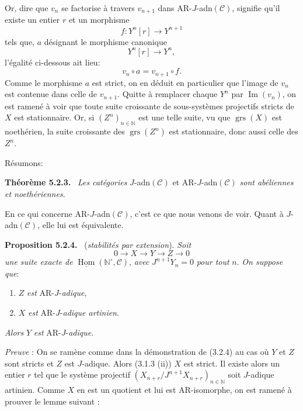 \documentclass[11pt]{article}
\newenvironment{statement}[1]{\par\medskip\noindent\textbf{#1.}\ }{\par\medskip}
\DeclareMathOperator{\Hom}{Hom}
\providecommand{\uHom}{\underline{\Hom}}
\providecommand{\Hom}{\operatorname{Hom}}
\providecommand{\Im}{\operatorname{Im}}
\renewcommand{\Im}{\operatorname{Im}}
\providecommand{\grs}{\operatorname{grs}}
\providecommand{\Im}{\operatorname{Im}}
\providecommand{\Hom}{\operatorname{Hom}}
\begin{document}
Or, dire que \(v_n\) se factorise à travers \(v_{n+1}\) dans AR-\(J\)-adn\((\mathcal C)\), signifie qu'il existe un entier \(r\) et un morphisme
\[
f:Y^n[r]\longrightarrow Y^{n+1}
\]
tels que, \(a\) désignant le morphisme canonique
\[
Y^n[r]\longrightarrow Y^n,
\]
l'égalité ci-dessous ait lieu:
\[
v_n\circ a=v_{n+1}\circ f .
\]
Comme le morphisme \(a\) est strict, on en déduit en particulier que l'image de \(v_n\) est contenue dans celle de \(v_{n+1}\). Quitte à remplacer chaque \(Y^n\) par \(\Im(v_n)\), on est ramené à voir que toute suite croissante de sous-systèmes projectifs stricts de \(X\) est stationnaire. Or, si \((Z^n)_{n\in\mathbb N}\) est une telle suite, vu que \(\grs(X)\) est noethérien, la suite croissante des \(\grs(Z^n)\) est stationnaire, donc aussi celle des \(Z^n\).

Résumons:

\begin{statement}{Théorème 5.2.3}
\emph{Les catégories} \(J\)-adn\((\mathcal C)\) et AR-\(J\)-adn\((\mathcal C)\) \emph{sont abéliennes et noethériennes}.
\end{statement}

En ce qui concerne AR-\(J\)-adn\((\mathcal C)\), c'est ce que nous venons de voir. Quant à \(J\)-adn\((\mathcal C)\), elle lui est équivalente.

\begin{statement}{Proposition 5.2.4}
(\emph{stabilités par extension}). \emph{Soit}
\[
0\longrightarrow X\longrightarrow Y\longrightarrow Z\longrightarrow0
\]
\emph{une suite exacte de} \(\uHom(\mathbb N^\circ,\mathcal C)\), \emph{avec} \(J^{n+1}Y_n=0\) \emph{pour tout} \(n\). \emph{On suppose que}:
\begin{enumerate}[label=\textup{(\roman*)}]
\item \(Z\) \emph{est} AR-\(J\)-\emph{adique},
\item \(X\) \emph{est} AR-\(J\)-\emph{adique artinien}.
\end{enumerate}
\emph{Alors} \(Y\) \emph{est} AR-\(J\)-\emph{adique}.
\end{statement}

\emph{Preuve} : On se ramène comme dans la démonstration de (3.2.4) au cas où \(Y\) et \(Z\) sont stricts et \(Z\) est \(J\)-adique. Alors (3.1.3 (ii)) \(X\) est strict. Il existe alors un entier \(r\) tel que le système projectif \((X_{n+r}/J^{n+1}X_{n+r})_{n\in\mathbb N}\) soit \(J\)-adique artinien. Comme \(X\) en est un quotient et lui est AR-isomorphe, on est ramené à prouver le lemme suivant :
\end{document}
